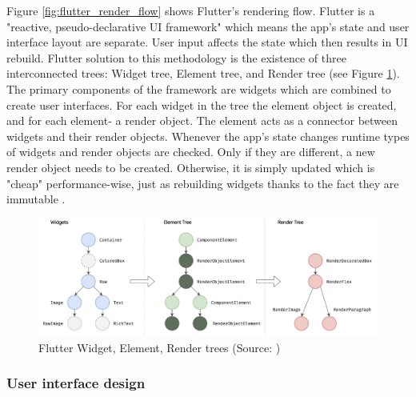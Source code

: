 Figure \ref{fig:flutter_render_flow} shows Flutter's rendering flow. Flutter is a "reactive, pseudo-declarative UI framework" which means the app's state and user interface layout are separate. User input affects the state which then results in UI rebuild. Flutter solution to this methodology is the existence of three interconnected trees: Widget tree, Element tree, and Render tree (see Figure \ref{fig:flutter_trees}). The primary components of the framework are widgets which are combined to create user interfaces. For each widget in the tree the element object is created, and for each element- a render object. The element acts as a connector between widgets and their render objects. Whenever the app's state changes runtime types of widgets and render objects are checked. Only if they are different, a new render object needs to be created. Otherwise, it is simply updated which is "cheap" performance-wise, just as rebuilding widgets thanks to the fact they are immutable \cite{flutter_docs_architecture}.

\begin{figure}[h]
	\centering
	\includegraphics[width=\textwidth]{img/flutter_trees}
	\caption{Flutter Widget, Element, Render trees (Source: \cite{flutter_docs_architecture})}
	\label{fig:flutter_trees}
\end{figure}

\subsubsection*{User interface design}

